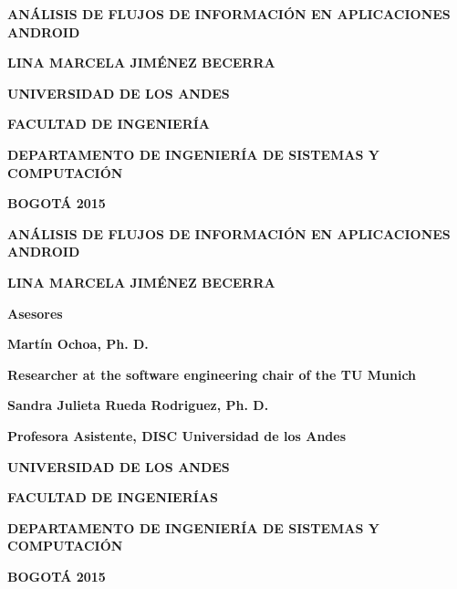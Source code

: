 \documentclass[a4paper, 11pt, oneside]{report}
\newcommand\portada{
	\begin{titlepage} 
		\begin{center}
			{\large \bf ANÁLISIS DE FLUJOS DE INFORMACIÓN EN APLICACIONES ANDROID  \par }
			\vfill
			{\large\bf LINA MARCELA JIMÉNEZ BECERRA \par}
			\vfill
			{\large\bf UNIVERSIDAD DE LOS ANDES  \par}
			{\large\bf FACULTAD DE INGENIERÍA \par}
			{\large\bf DEPARTAMENTO DE INGENIERÍA DE SISTEMAS Y COMPUTACIÓN \par}
			{\large\bf  BOGOTÁ 2015 \par}
		\end{center}
	\end{titlepage}
}
\newcommand\contraportada{
	\begin{titlepage}
		\begin{center}
			{\large \bf ANÁLISIS DE FLUJOS DE INFORMACIÓN EN APLICACIONES ANDROID \par}
			\vfill
			{\large\bf LINA MARCELA JIMÉNEZ BECERRA \par}
			\vfill
			{\large\bf Asesores\par}
			{\large\bf Martín Ochoa, Ph. D. \par}
			{\large\bf Researcher at the software engineering chair of the TU Munich\par}
			{\large\bf Sandra Julieta Rueda Rodriguez, Ph. D. \par}
			{\large\bf Profesora Asistente, DISC Universidad de los Andes\par}
			\vfill
			{\large\bf UNIVERSIDAD DE LOS ANDES  \par}
			{\large\bf FACULTAD DE INGENIERÍAS \par}
			{\large\bf DEPARTAMENTO DE INGENIERÍA DE SISTEMAS Y COMPUTACIÓN \par}
			{\large\bf BOGOTÁ 2015 \par}
		\end{center}
	\end{titlepage}
}
\begin{document}
 
\portada  
\contraportada
\tableofcontents
\renewcommand{\tablename}{Tabla}
\renewcommand\chaptername{CAPÍTULO} 



 




  
 

\renewcommand{\listtablename}{ÍNDICE DE TABLAS}\listoftables
\renewcommand{\listfigurename}{ÍNDICE DE GRÁFICAS}\listoffigures
\end{document}
